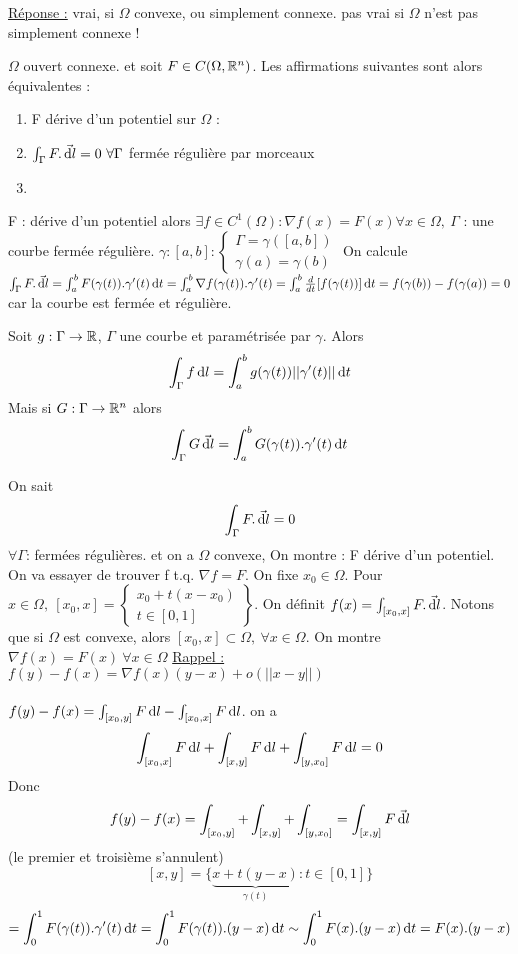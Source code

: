 \documentclass[12pt,a4paper]{article}
\begin{document}
\uline{Réponse :} vrai, si $\Omega$ convexe, ou simplement connexe. pas vrai si $\Omega$ n'est pas simplement connexe !

\begin{boite}
	 $\Omega$ ouvert connexe. et soit $F \in C(\Omega,\mathbb{R}^n)$. Les affirmations suivantes sont alors équivalentes :
	\begin{enumerate}
		\item	F dérive d'un potentiel sur $\Omega$ : 
		\item 	$\int_\Gamma F.\vec{\deriv{l}} = 0\ \forall \Gamma$ fermée régulière par morceaux
		\item 	
	\end{enumerate}	 
\end{boite}

 F : dérive d'un potentiel alors $\exists f \in C^1(\Omega) : \nabla f(x) = F(x) \forall x \in \Omega,\ \Gamma$ : une courbe fermée régulière. $\gamma : [a,b] : \left\{\begin{array}{l}
\Gamma = \gamma ([a,b])\\
\gamma(a) = \gamma(b)
\end{array}\right.$ On calcule $\int_\Gamma F . \vec{\, \mathrm d l} = \int_a^b F(\gamma(t)).\gamma'(t) \, \mathrm d t = \int_a^b \nabla f(\gamma(t)).\gamma'(t) = \int_a^b \frac{d}{dt}[f(\gamma(t))] \, \mathrm d t = f(\gamma(b)) - f(\gamma(a)) = 0$ car la courbe est fermée et régulière.

\begin{boite}
	 Soit $g : \Gamma \to \mathbb{R}$, $\Gamma$ une courbe et paramétrisée par $\gamma$. Alors 
		\[\int_\Gamma f \, \mathrm d l = \int_a^b g(\gamma(t)) ||\gamma'(t)|| \, \mathrm d t\]
		Mais si $G : \Gamma \to \mathbb{R}^n$ alors
		\[\int_\Gamma G \vec{\, \mathrm d l} = \int_a^b G(\gamma(t)).\gamma'(t) \, \mathrm d t\]
\end{boite}

 On sait
\[\int_\Gamma F.\vec{\, \mathrm d l} = 0\] $ \forall \Gamma$: fermées régulières. et on a $\Omega$ convexe, On montre : F dérive d'un potentiel.\\
On va essayer de trouver f t.q. $\nabla f = F$. On fixe $x_0 \in \Omega$. Pour $x\in \Omega,\ [x_0,x] = \left\{\begin{array}{l}
x_0 + t(x-x_0)\\
t\in [0,1]
\end{array}\right\}$. On définit $f(x) = \int_{[x_0,x]} F.\vec{\, \mathrm d l}$. Notons que si $\Omega$ est convexe, alors $[x_0,x] \subset \Omega,\ \forall x \in \Omega$. On montre $\nabla f(x) = F(x)\ \forall x \in \Omega$
\uline{Rappel :} $f(y) - f(x) = \nabla f(x)(y-x) + o(||x-y||)$\\
\\
$f(y) - f(x) = \int_{[x_0,y]} F \, \mathrm d l - \int_{[x_0,x]} F \, \mathrm d l$. on a 
\[\int_{[x_0,x]} F \, \mathrm d l + \int_{[x,y]} F \, \mathrm d l + \int_{[y,x_0]} F \, \mathrm d l = 0\]
Donc 
\[f(y) - f(x) = \int_{[x_0,y]} + \int_{[x,y]} + \int_{[y,x_0]} = \int_{[x,y]} F \vec{\, \mathrm d l}\] (le premier et troisième s'annulent)
\[[x,y] = \{\underbrace{x+t(y-x)}_{\gamma(t)} : t \in [0,1]\}\]
\[= \int_0^1 F(\gamma(t)).\gamma'(t) \, \mathrm d t = \int_0^1 F(\gamma(t)).(y-x) \, \mathrm d t \sim \int_0^1 F(x).(y-x) \, \mathrm d t = F(x).(y-x)\]
\end{document}
